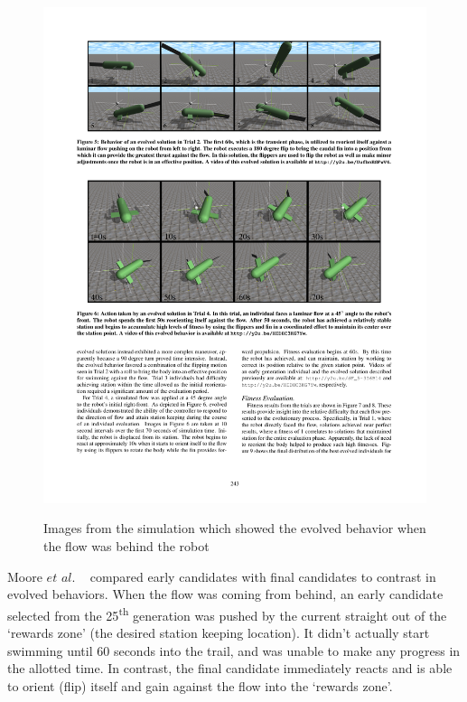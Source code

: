 \documentclass{sig-alternate}
\begin{document}
\begin{figure}%
\center
\caption{Images from the simulation which showed the evolved behavior when the flow was behind the robot}

  \includegraphics[scale=1]{sr1}
\label{fig:robot flip}
\end{figure}

  Moore $et$ $al.$ ~\cite{Moore:2013:ESK:2463372.2463402} compared early candidates with final candidates to contrast in evolved behaviors. When the flow was coming from behind, an early candidate selected from the 25\textsuperscript{th} generation was pushed by the current straight out of the `rewards zone' (the desired station keeping location). It didn't actually start swimming until 60 seconds into the trail, and was unable to make any progress in the allotted time. In contrast, the final candidate immediately reacts and is able to orient (flip) itself and gain against the flow into the `rewards zone'. 
\end{document}
